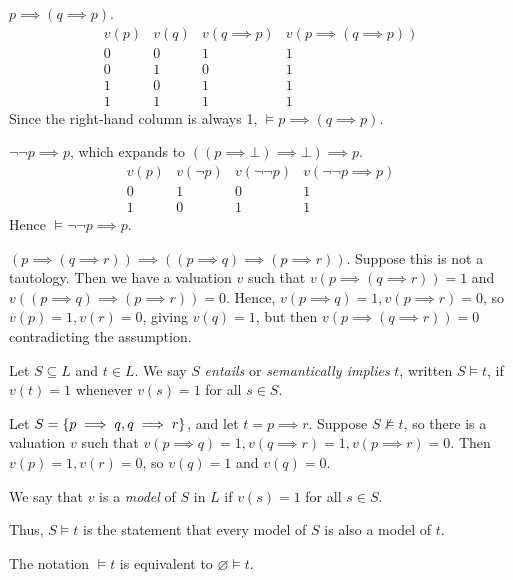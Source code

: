 \begin{example}
    \( p \implies (q \implies p) \).
    \[ \begin{array}{cccc}
        v(p) & v(q) & v(q \implies p) & v(p \implies (q \implies p)) \\
        0 & 0 & 1 & 1 \\
        0 & 1 & 0 & 1 \\
        1 & 0 & 1 & 1 \\
        1 & 1 & 1 & 1
    \end{array} \]
    Since the right-hand column is always 1, \( \models p \implies (q \implies p) \).
\end{example}
\begin{example}
    \( \neg \neg p \implies p \), which expands to \( ((p \implies \bot) \implies \bot) \implies p \).
    \[ \begin{array}{cccc}
        v(p) & v(\neg p) & v(\neg \neg p) & v(\neg \neg p \implies p) \\
        0 & 1 & 0 & 1 \\
        1 & 0 & 1 & 1
    \end{array} \]
    Hence \( \models \neg \neg p \implies p \).
\end{example}
\begin{example}
    \( (p \implies (q \implies r)) \implies ((p \implies q) \implies (p \implies r)) \).
    Suppose this is not a tautology.
    Then we have a valuation \( v \) such that \( v(p \implies (q \implies r)) = 1 \) and \( v((p \implies q) \implies (p \implies r)) = 0 \).
    Hence, \( v(p \implies q) = 1, v(p \implies r) = 0 \), so \( v(p) = 1, v(r) = 0 \), giving \( v(q) = 1 \), but then \( v(p \implies (q \implies r)) = 0 \) contradicting the assumption.
\end{example}
\begin{definition}
    Let \( S \subseteq L \) and \( t \in L \).
    We say \( S \) \emph{entails} or \emph{semantically implies} \( t \), written \( S \models t \), if \( v(t) = 1 \) whenever \( v(s) = 1 \) for all \( s \in S \).
\end{definition}
\begin{example}
    Let \( S = \qty{p \implies q, q \implies r} \), and let \( t = p \implies r \).
    Suppose \( S \not\models t \), so there is a valuation \( v \) such that \( v(p \implies q) = 1, v(q \implies r) = 1, v(p \implies r) = 0 \).
    Then \( v(p) = 1, v(r) = 0 \), so \( v(q) = 1 \) and \( v(q) = 0 \).
\end{example}
\begin{definition}
    We say that \( v \) is a \emph{model} of \( S \) in \( L \) if \( v(s) = 1 \) for all \( s \in S \).
\end{definition}
Thus, \( S \models t \) is the statement that every model of \( S \) is also a model of \( t \).
\begin{remark}
    The notation \( \models t \) is equivalent to \( \varnothing \models t \).
\end{remark}

